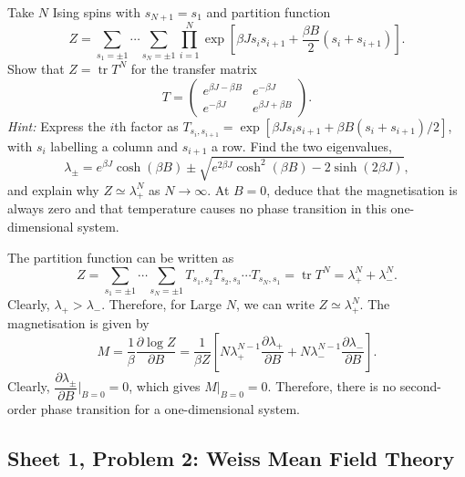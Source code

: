 Take $N$ Ising spins with $s_{N+1}=s_1$ and partition function
\begin{equation}
    Z=\sum_{s_1=\pm1}\cdots\sum_{s_N=\pm1}
    \prod_{i=1}^{N}
    \exp\!\left[\beta J s_i s_{i+1}
    +\frac{\beta B}{2}(s_i+s_{i+1})\right].
\end{equation}
Show that $Z=\operatorname{tr}T^N$ for the transfer matrix
\begin{equation}
    T=\begin{pmatrix}
        e^{\beta J-\beta B}&e^{-\beta J}\\
        e^{-\beta J}&e^{\beta J+\beta B}
    \end{pmatrix}.
\end{equation}
\textit{Hint:} Express the $i$th factor as
$T_{s_i,s_{i+1}}=\exp[\beta J s_i s_{i+1}
+\beta B(s_i+s_{i+1})/2]$, with $s_i$ labelling a column and
$s_{i+1}$ a row. Find the two eigenvalues,
\begin{equation}
    \lambda_\pm=e^{\beta J}\cosh(\beta B)
    \pm\sqrt{e^{2\beta J}\cosh^2(\beta B)-2\sinh(2\beta J)},
\end{equation}
and explain why $Z\simeq\lambda_+^N$ as $N\to\infty$. At $B=0$, deduce
that the magnetisation is always zero and that temperature causes no phase
transition in this one-dimensional system.
\begin{solution}
    The partition function can be written as
    \begin{equation}
        Z = \sum_{s_1 = \pm1} \cdots\sum_{s_N = \pm1} T_{s_1,s_2} T_{s_2,s_3}\cdots T_{s_N , s_1} = \operatorname{tr} T^N = \lambda_+^N + \lambda_-^N.
    \end{equation}
    Clearly, $\lambda_+ > \lambda_-$. Therefore, for Large $N$, we can write $Z  \simeq \lambda_+^N$. The magnetisation is given by
    \begin{equation}
        M = \frac{1}{\beta}\frac{\partial \log Z}{\partial B} = \frac{1}{\beta Z}\left[N\lambda_+^{N-1}\frac{\partial \lambda_+}{\partial B} + N\lambda_-^{N-1}\frac{\partial \lambda_-}{\partial B}\right].
    \end{equation}
    Clearly, $\dfrac{\partial \lambda_\pm}{\partial B}\bigg|_{B=0} = 0$, which gives $M \bigg|_{B=0} = 0$. Therefore, there is no second-order phase transition for a one-dimensional system.

\end{solution}

\subsection{Sheet 1, Problem 2: Weiss Mean Field Theory}

